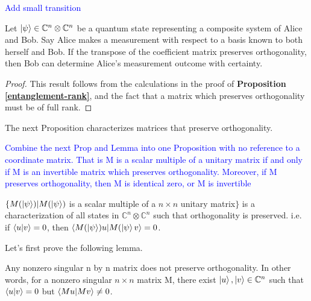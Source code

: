 \textcolor{blue}{Add small transition}



\begin{prop}
Let $\ket{\psi} \in \mathbb{C}^n \otimes \mathbb{C}^{n}$ be a quantum state representing a composite system of Alice and Bob. Say Alice makes a measurement with respect to a basis known to both herself and Bob.  If the transpose of the coefficient matrix preserves orthogonality, then Bob can determine Alice's measurement outcome with certainty. 
\end{prop}

\begin{proof}
This result follows from the calculations in the proof of \textbf{Proposition \ref{entanglement-rank}}, and the fact that a matrix which preserves orthogonality must be of full rank.
\end{proof}
The next Proposition characterizes matrices that preserve orthogonality.

\textcolor{blue}{Combine the next Prop and Lemma into one Proposition with no reference to a coordinate matrix.  That is M is a scalar multiple of a unitary matrix if and only if M is an invertible matrix which preserves orthogonality.  Moreover, if M preserves orthogonality, then M is identical zero, or M is invertible}


\begin{prop} \label{orthogonality preserving character}
$\{M(\ket{\psi})|M(\ket{\psi})$ is a scalar multiple of a $n \times n$ unitary matrix$\}$ is a characterization of all states in $\mathbb{C}^n \otimes \mathbb{C}^n$ such that orthogonality is preserved. i.e. if $\braket{u|v}=0$, then $\braket{M(\ket{\psi})u|M(\ket{\psi}v}=0$.
\end{prop}

Let's first prove the following lemma.

\begin{lemma}
Any nonzero singular n by n matrix does not preserve orthogonality. In other words, for a nonzero singular $n \times n$ matrix M, there exist $\ket{u}, \ket{v} \in \mathbb{C}^n$ such that $\braket{u|v}=0$ but $\braket{Mu|Mv} \ne 0$.
\end{lemma}

